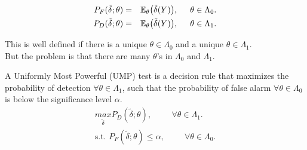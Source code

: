 \documentclass[a4paper,english,12pt]{article}
\begin{document}
\begin{eqnarray}
P_F(\tilde{\delta}; \theta) &=& \mathbb{E}_\theta\big(\tilde{\delta}(Y)\big), \hspace{0.5cm} \theta \in \Lambda_0.\\
P_D(\tilde{\delta}; \theta) &=& \mathbb{E}_\theta\big(\tilde{\delta}(Y)\big), \hspace{0.5cm} \theta \in \Lambda_1.
\end{eqnarray}	

This is well defined if there is a unique $\theta \in \Lambda_0$ and a unique $\theta \in \Lambda_1$.\\
But the problem is that there are many $\theta$'s in $\Lambda_0$ and $\Lambda_1$.\\

\begin{defn}
A Uniformly Most Powerful (UMP) test is a decision rule that maximizes the probability of detection $\forall \theta \in \Lambda_1$, such that the probability of false alarm $\forall \theta \in \Lambda_0$ is below the significance level $\alpha$.
\begin{eqnarray*}
\underset{\tilde{\delta}}{max} P_D(\tilde{\delta}; \theta), \hspace{1cm} \forall \theta \in \Lambda_1.\\
\text{s.t.  } P_F(\tilde{\delta}; \theta) \leq \alpha, \hspace{1cm} \forall \theta \in \Lambda_0.
\end{eqnarray*}	
\end{defn}
	 
\end{document}
